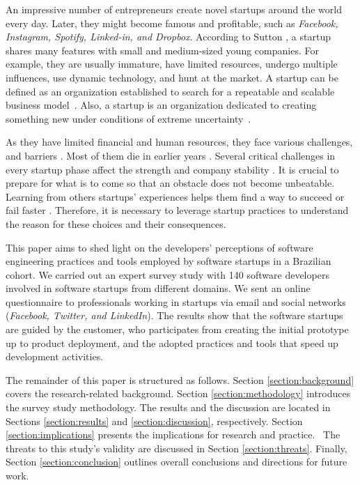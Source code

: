 \documentclass[runningheads]{llncs}
\begin{document}
An impressive number of entrepreneurs create novel startups around the world every day. Later, they might become famous and profitable, such as \textit{Facebook, Instagram, Spotify, Linked-in, and Dropbox}. According to Sutton \cite{sutton2000role}, a startup shares many features with small and medium-sized young companies. For example, they are usually immature, have limited resources, undergo multiple influences, use dynamic technology, and hunt at the market. A startup can be defined as an organization established to search for a repeatable and scalable business model~\cite{blank2010startup}. Also, a startup is an organization dedicated to creating something new under conditions of extreme uncertainty~\cite{Ries2011lean}.

As they have limited financial and human resources, they face various challenges, and barriers \cite{Giardino2015,Klotins2015}. Most of them die in earlier years \cite{Ries2011lean}. Several critical challenges in every startup phase affect the strength and company stability \cite{Nguyen-DucWA2018}. It is crucial to prepare for what is to come so that an obstacle does not become unbeatable. Learning from others startups' experiences helps them find a way to succeed or fail faster \cite{Cavalcante2018,Crowne2002}. Therefore, it is necessary to leverage startup practices to understand the reason for these choices and their consequences.


This paper aims to shed light on the developers' perceptions of software engineering practices and tools employed by software startups in a Brazilian cohort. We carried out an expert survey study with 140 software developers involved in software startups from different domains. We sent an online questionnaire to professionals working in startups via email and social networks (\textit{Facebook, Twitter, and LinkedIn}). The results show that the software startups are guided by the customer, who participates from creating the initial prototype up to product deployment, and the adopted practices and tools that speed up development activities.

The remainder of this paper is structured as follows. Section \ref{section:background} covers the research-related background. Section \ref{section:methodology} introduces the survey study methodology. The results and the discussion are located in Sections \ref{section:results} and \ref{section:discussion}, respectively. Section \ref{section:implications} presents the implications for research and practice. ~The threats to this study's validity are discussed in Section \ref{section:threats}. Finally, Section \ref{section:conclusion} outlines overall conclusions and directions for future work.
\end{document}
